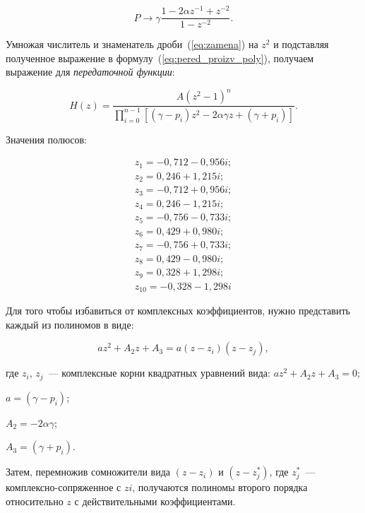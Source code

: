 \begin{equation}
  \label{eq:zamena}
  P  \rightarrow \gamma \frac{1 - 2 \alpha z^{-1}+z^{-2}}{1-z^{-2}}.
\end{equation}

Умножая числитель и знаменатель дроби~(\ref{eq:zamena}) на $z^2$ и
подставляя полученное выражение в
формулу~(\ref{eq:pered_proizv_poly}), получаем выражение для
\textit{передаточной функции}:

\begin{equation*}
  H(z) = \frac{A(z^2-1)^n}{\displaystyle \prod_{i=0}^{n-1}\left[(\gamma - p_i)z^2 - 2
      \alpha \gamma z + (\gamma + p_i)\right]}.
\end{equation*}

\point Значения полюсов:

\begin{align*}
  z_{1}= -0{,}712 - 0{,}956i;\\
  z_{2}= 0{,}246 + 1{,}215i;\\
  z_{3}= -0{,}712 + 0{,}956i;\\
  z_{4}= 0{,}246 - 1{,}215i;\\
  z_{5}= -0{,}756 - 0{,}733i;\\
  z_{6}= 0{,}429 + 0{,}980i;\\
  z_{7}= -0{,}756 + 0{,}733i;\\
  z_{8}= 0{,}429 - 0{,}980i;\\
  z_{9}= 0{,}328 + 1{,}298i;\\
  z_{10} = -0{,}328 - 1{,}298i
\end{align*}

\point Для того чтобы избавиться от комплексных коэффициентов, нужно
представить каждый из полиномов в виде:

\begin{equation*}
  az^2 + A_2z + A_3 = a(z-z_i)(z-z_j),
\end{equation*}

\begin{ESKDexplanation}
\item[где ] $z_i$, $z_j$~--- комплексные корни квадратных уравнений
  вида: $az^2 + A_2z + A_3 = 0$;
\item $a = (\gamma - p_i)$;
\item $A_2 = - 2 \alpha \gamma$;
\item $A_3 = (\gamma + p_i)$.
\end{ESKDexplanation}

Затем, перемножив сомножители вида $(z - z_i)$ и $(z- z_j^*)$, где
$z_j^*$~--- комплексно-сопряженное с $zi$, получаются полиномы второго
порядка относительно $z$ с действительными коэффициентами.

